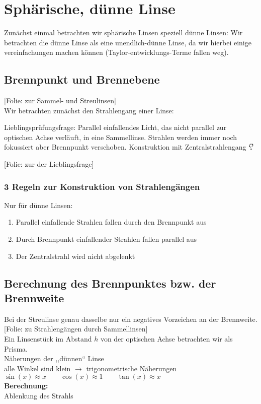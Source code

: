 \documentclass[titlepage,11pt,a4paper,ngerman]{report}
\newcommand{\folie}[1]{\color{gray}[Folie: #1]\color{black}}
\newcommand{\lcom}[1]{\color{MidnightBlue}#1\color{black}}
\newcommand{\mau}{$\buildrel \mathcal{O} \over{\textbf{.}}$}
\newcommand{\rbox}[1]{\begin{tcolorbox}[colback=white,colframe=red!75!black]#1\end{tcolorbox}}
\begin{document}
\section{Sphärische, dünne Linse}
\lcom{Zunächst einmal betrachten wir sphärische Linsen speziell dünne Linsen: Wir betrachten die dünne Linse als eine unendlich-dünne Linse, da wir hierbei einige vereinfachungen machen können (Taylor-entwicklungs-Terme fallen weg).}

\subsection{Brennpunkt und Brennebene}
\folie{zur Sammel- und Streulinsen}\\
Wir betrachten zunächst den Strahlengang einer Linse:\\

\rbox{\begin{minipage}{\linewidth}
		\lcom{Lieblingsprüfungsfrage: Parallel einfallendes Licht, das nicht parallel zur optischen Achse verläuft, in eine Sammellinse. Strahlen werden immer noch fokussiert aber Brennpunkt verschoben. Konstruktion mit Zentralstrahlengang \mau}
	\end{minipage}}
\noindent
\folie{zur der Lieblingsfrage}

\subsubsection{3 Regeln zur Konstruktion von Strahlengängen}
Nur für dünne Linsen:
\begin{enumerate}[1)]
	\item Parallel einfallende Strahlen fallen durch den Brennpunkt aus
	\item Durch Brennpunkt einfallender Strahlen fallen parallel aus
	\item Der Zentralstrahl wird nicht abgelenkt
\end{enumerate}

\subsection{Berechnung des Brennpunktes bzw. der Brennweite}
\lcom{Bei der Streulinse genau dasselbe nur ein negatives Vorzeichen an der Brennweite.}\\
\folie{zu Strahlengängen durch Sammellinsen}\\[5pt]
Ein Linsenstück im Abstand $ h $ von der optischen Achse betrachten wir als Prisma.\\[5pt]
Näherungen der ,,dünnen`` Linse\\[5pt]
alle Winkel sind klein $ \rightarrow $ trigonometrische Näherungen\\
$ \sin(x) \approx x \qquad \cos(x) \approx 1 \qquad \tan(x) \approx x $\\[5pt]
\textbf{Berechnung:}\\
Ablenkung des Strahls
\end{document}
